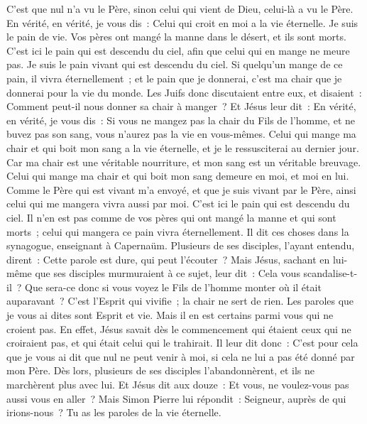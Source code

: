 \begin{multicols}{2}
C'est que nul n'a vu le Père, sinon celui qui vient de Dieu, celui-là a vu le Père.
En vérité, en vérité, je vous dis~: Celui qui croit en moi a la vie éternelle.
Je suis le pain de vie.
Vos pères ont mangé la manne dans le désert, et ils sont morts.
C'est ici le pain qui est descendu du ciel, afin que celui qui en mange ne meure pas.
Je suis le pain vivant qui est descendu du ciel. Si quelqu'un mange de ce pain, il vivra éternellement~; et le pain que je donnerai, c'est ma chair que je donnerai pour la vie du monde.
Les Juifs donc discutaient entre eux, et disaient~: Comment peut-il nous donner sa chair à manger~?
Et Jésus leur dit~: En vérité, en vérité, je vous dis~: Si vous ne mangez pas la chair du Fils de l'homme, et ne buvez pas son sang, vous n'aurez pas la vie en vous-mêmes.
Celui qui mange ma chair et qui boit mon sang a la vie éternelle, et je le ressusciterai au dernier jour.
Car ma chair est une véritable nourriture, et mon sang est un véritable breuvage.
Celui qui mange ma chair et qui boit mon sang demeure en moi, et moi en lui.
Comme le Père qui est vivant m'a envoyé, et que je suis vivant par le Père, ainsi celui qui me mangera vivra aussi par moi.
C'est ici le pain qui est descendu du ciel. Il n'en est pas comme de vos pères qui ont mangé la manne et qui sont morts~; celui qui mangera ce pain vivra éternellement.
Il dit ces choses dans la synagogue, enseignant à Capernaüm.
Plusieurs de ses disciples, l'ayant entendu, dirent~: Cette parole est dure, qui peut l'écouter~?
Mais Jésus, sachant en lui-même que ses disciples murmuraient à ce sujet, leur dit~: Cela vous scandalise-t-il~?
Que sera-ce donc si vous voyez le Fils de l'homme monter où il était auparavant~?
C'est l'Esprit qui vivifie~; la chair ne sert de rien. Les paroles que je vous ai dites sont Esprit et vie.
Mais il en est certains parmi vous qui ne croient pas. En effet, Jésus savait dès le commencement qui étaient ceux qui ne croiraient pas, et qui était celui qui le trahirait.
Il leur dit donc~: C'est pour cela que je vous ai dit que nul ne peut venir à moi, si cela ne lui a pas été donné par mon Père.
Dès lors, plusieurs de ses disciples l'abandonnèrent, et ils ne marchèrent plus avec lui.
Et Jésus dit aux douze~: Et vous, ne voulez-vous pas aussi vous en aller~?
Mais Simon Pierre lui répondit~: Seigneur, auprès de qui irions-nous~? Tu as les paroles de la vie éternelle.

\end{multicols}
